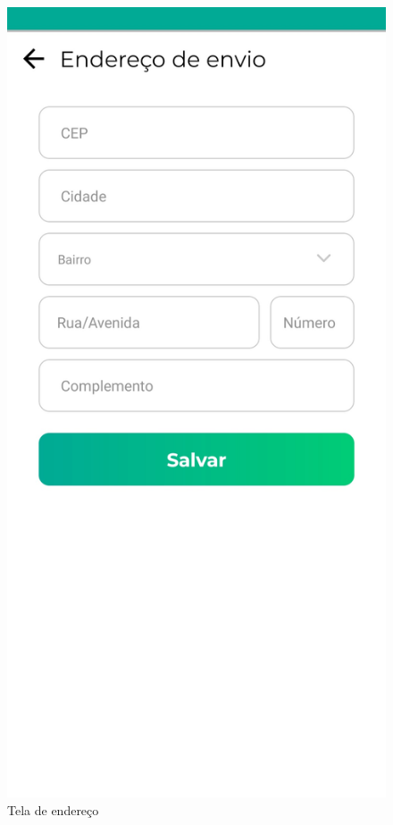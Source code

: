 \begin{figure}[h]
	\centering
	\includegraphics[keepaspectratio=true,scale=0.16]{figuras/tela_endereco.jpg}
	\caption{Tela de endereço}
        \label{tela-endereco-app}
\end{figure}

